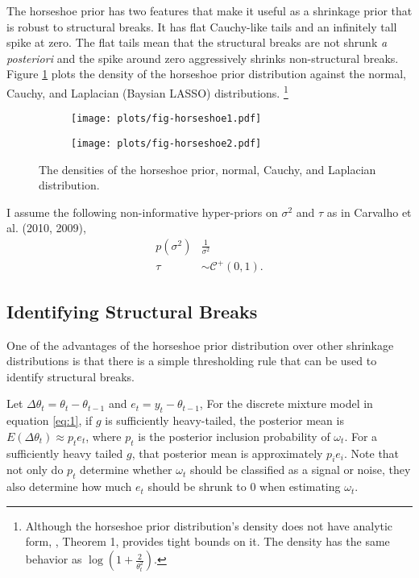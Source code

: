 \documentclass{article}
\newcommand{\paren}[1]{\ensuremath{\left(#1\right)}}
\newcommand{\dhalfcauchy}[1]{\ensuremath{\mathcal{C}^{+}\paren{#1}}}
\begin{document}
The horseshoe prior has two features that make it useful as a shrinkage prior that is robust to structural breaks.
It has flat Cauchy-like tails and an infinitely tall spike at zero.
The flat tails mean that the structural breaks are not shrunk \textit{a posteriori} and the spike around zero aggressively shrinks non-structural breaks.
Figure \ref{fig:horseshoe} plots the density of the horseshoe prior distribution against the normal, Cauchy, and Laplacian (Baysian LASSO) distributions.%
\footnote{
  Although the horseshoe prior distribution's density does not have analytic form, \textcite{CarvalhoPolsonScott2010}, Theorem 1, provides tight bounds on it.
  The density has the same behavior as $\log (1 + \frac{2}{\theta_{t}^{2}})$.
}

\begin{figure}
  \centering
  \begin{subfigure}[b]{0.5\textwidth}
    \texttt{[image: plots/fig-horseshoe1.pdf]}
  \end{subfigure}%
  \begin{subfigure}[b]{0.5\textwidth}
    \texttt{[image: plots/fig-horseshoe2.pdf]}
  \end{subfigure}
  \caption{The densities of the horseshoe prior, normal, Cauchy, and Laplacian distribution.}
  \label{fig:horseshoe}
\end{figure}

I assume the following non-informative hyper-priors on $\sigma^{2}$ and $\tau$ as in Carvalho et al. (2010, 2009),
\begin{align}
  \label{eq:9}
  p(\sigma^{2}) & \frac{1}{\sigma^{2}}  \\
  \label{eq:11}
  \tau &\sim \dhalfcauchy{0, 1} \text{.}
\end{align}

\subsection{Identifying Structural Breaks}
\label{sec:ident-struct-breaks}

One of the advantages of the horseshoe prior distribution over other shrinkage distributions is that there is a simple thresholding rule that can be used to identify structural breaks.

Let $\Delta \theta_{t} = \theta_{t} - \theta_{t - 1}$ and $e_{t} = y_{t} - \theta_{t - 1}$, 
For the discrete mixture model in equation \eqref{eq:1}, if $g$ is sufficiently heavy-tailed, the posterior mean is $E(\Delta \theta_{t}) \approx p_{t} e_{t} $, where $p_{t}$ is the posterior inclusion probability of $\omega_{t}$.
For a sufficiently heavy tailed $g$, that posterior mean is approximately $p_{i} e_{i}$.
Note that not only do $p_{t}$ determine whether $\omega_{t}$ should be classified as a signal or noise, they also determine how much $e_{t}$ should be shrunk to 0 when estimating $\omega_{t}$.
\end{document}
